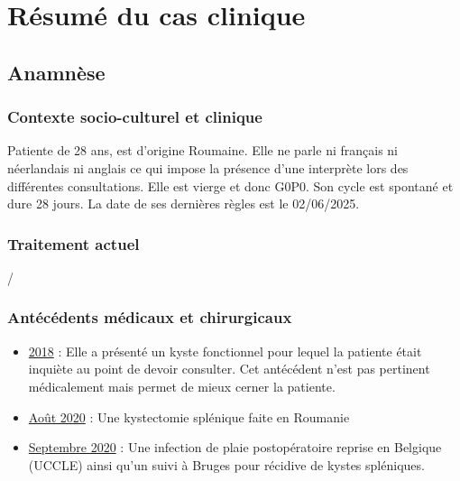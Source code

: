 \section{Résumé du cas clinique}

\subsection{Anamnèse}

\subsubsection{Contexte socio-culturel et clinique}
Patiente de 28 ans, est d’origine Roumaine. Elle ne parle ni français ni néerlandais ni anglais ce qui impose la présence d’une interprète lors des différentes consultations. Elle est vierge et donc G0P0. Son cycle est spontané et dure 28 jours. La date de ses dernières règles est le 02/06/2025.

\subsubsection{Traitement actuel}
/

\subsubsection{Antécédents médicaux et chirurgicaux}
\begin{itemize}[compact, label=\textbullet]
    \item \underline{2018} : Elle a présenté un kyste fonctionnel pour lequel la patiente était inquiète au point de devoir consulter. Cet antécédent n’est pas pertinent médicalement mais permet de mieux cerner la patiente.
    
    \item \underline{Août 2020} : Une kystectomie splénique faite en Roumanie
    
    \item \underline{Septembre 2020} : Une infection de plaie postopératoire reprise en Belgique (UCCLE) ainsi qu’un suivi à Bruges pour récidive de kystes spléniques.
\end{itemize}

